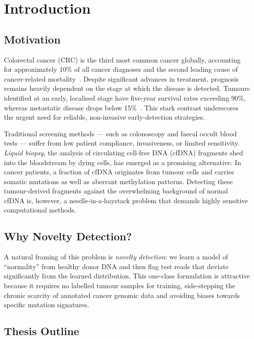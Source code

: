 \chapter{Introduction}\label{ch:introduction}

\section{Motivation}\label{sec:motivation}

Colorectal cancer (CRC) is the third most common cancer globally, accounting for
approximately 10\% of all cancer diagnoses and the second leading cause of
cancer-related mortality~\cite{sung2021global}. Despite significant advances in
treatment, prognosis remains heavily dependent on the stage at which the disease
is detected. Tumours identified at an early, localised stage have five-year
survival rates exceeding 90\%, whereas metastatic disease drops below
15\%~\cite{siegel2020colorectal}. This stark contrast underscores the urgent
need for reliable, non-invasive early-detection strategies.

Traditional screening methods --- such as colonoscopy and faecal occult blood
tests --- suffer from low patient compliance, invasiveness, or limited
sensitivity. \emph{Liquid biopsy}, the analysis of circulating cell-free DNA
(cfDNA) fragments shed into the bloodstream by dying cells, has emerged as a
promising alternative. In cancer patients, a fraction of cfDNA originates from
tumour cells and carries somatic mutations as well as aberrant methylation
patterns. Detecting these tumour-derived fragments against the overwhelming
background of normal cfDNA is, however, a needle-in-a-haystack problem that
demands highly sensitive computational methods.

\section{Why Novelty Detection?}\label{sec:why-novelty}

A natural framing of this problem is \emph{novelty detection}: we learn a model
of ``normality'' from healthy donor DNA and then flag test reads that deviate
significantly from the learned distribution. This one-class formulation is
attractive because it requires no labelled tumour samples for training, side-stepping
the chronic scarcity of annotated cancer genomic data and avoiding biases towards
specific mutation signatures.

\section{Thesis Outline}\label{sec:outline}

